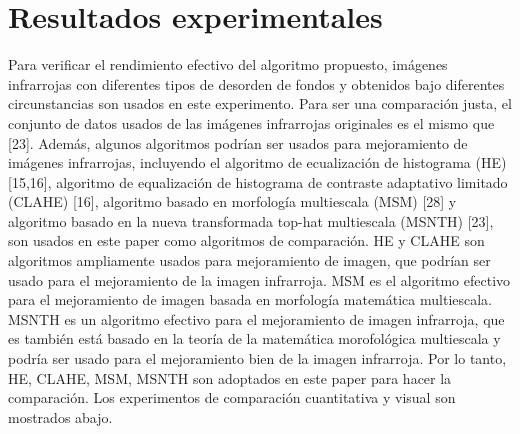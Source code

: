 \documentclass[a4paper, 11 pt, conference]{ieeeconf}      %
\begin{document}
\section{Resultados experimentales}
Para verificar el rendimiento efectivo del algoritmo propuesto, im\'agenes infrarrojas con diferentes tipos de desorden de fondos y obtenidos bajo diferentes circunstancias son usados en este experimento. Para ser una comparaci\'on justa, el conjunto de datos usados de las im\'agenes infrarrojas originales es el mismo que [23]. Adem\'as, algunos algoritmos podr\'ian ser usados para mejoramiento de im\'agenes infrarrojas, incluyendo el algoritmo de ecualizaci\'on de histograma (HE)[15,16], algoritmo de equalizaci\'on  de histograma de contraste adaptativo limitado (CLAHE) [16], algoritmo basado en morfolog\'ia multiescala (MSM) [28] y algoritmo basado en la nueva transformada top-hat multiescala (MSNTH) [23], son usados en este paper como algoritmos de comparaci\'on. HE y CLAHE son algoritmos ampliamente usados para mejoramiento de imagen, que podr\'ian ser usado para el mejoramiento de la imagen infrarroja. MSM es el algoritmo efectivo para el mejoramiento de imagen basada en morfolog\'ia matem\'atica multiescala. MSNTH es un algoritmo efectivo para el mejoramiento de imagen infrarroja, que es tambi\'en est\'a basado en la teor\'ia de la matem\'atica morofol\'ogica multiescala y podr\'ia ser usado para el mejoramiento bien de la imagen infrarroja. Por lo tanto, HE, CLAHE, MSM, MSNTH son adoptados en este paper para hacer la comparaci\'on. Los experimentos de comparaci\'on cuantitativa y visual son mostrados abajo.
\end{document}
